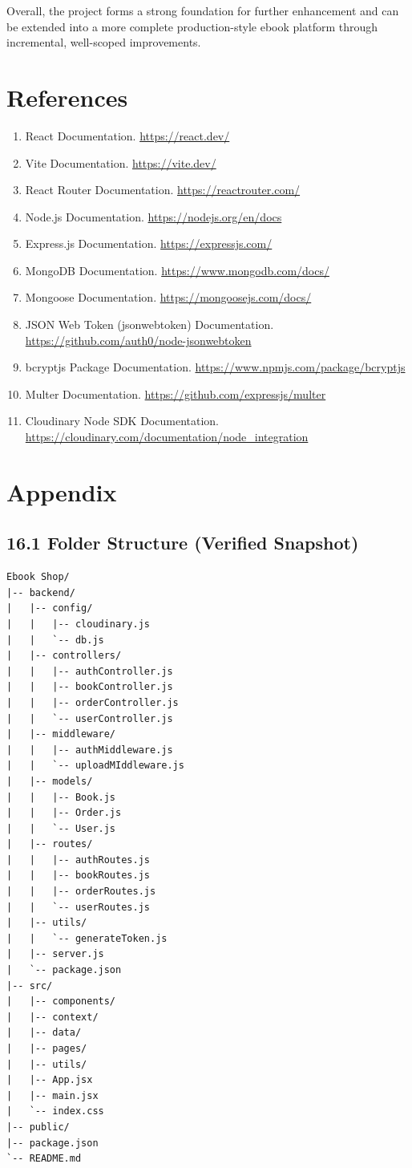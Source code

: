 \documentclass[12pt,a4paper]{report}
\begin{document}
Overall, the project forms a strong foundation for further enhancement and can be extended into a more complete production-style ebook platform through incremental, well-scoped improvements.

\chapter{References}
\begin{enumerate}[label=\arabic*.]
    \item React Documentation. \url{https://react.dev/}
    \item Vite Documentation. \url{https://vite.dev/}
    \item React Router Documentation. \url{https://reactrouter.com/}
    \item Node.js Documentation. \url{https://nodejs.org/en/docs}
    \item Express.js Documentation. \url{https://expressjs.com/}
    \item MongoDB Documentation. \url{https://www.mongodb.com/docs/}
    \item Mongoose Documentation. \url{https://mongoosejs.com/docs/}
    \item JSON Web Token (jsonwebtoken) Documentation. \url{https://github.com/auth0/node-jsonwebtoken}
    \item bcryptjs Package Documentation. \url{https://www.npmjs.com/package/bcryptjs}
    \item Multer Documentation. \url{https://github.com/expressjs/multer}
    \item Cloudinary Node SDK Documentation. \url{https://cloudinary.com/documentation/node_integration}
\end{enumerate}

\chapter{Appendix}
\section*{16.1 Folder Structure (Verified Snapshot)}
\begin{verbatim}
Ebook Shop/
|-- backend/
|   |-- config/
|   |   |-- cloudinary.js
|   |   `-- db.js
|   |-- controllers/
|   |   |-- authController.js
|   |   |-- bookController.js
|   |   |-- orderController.js
|   |   `-- userController.js
|   |-- middleware/
|   |   |-- authMiddleware.js
|   |   `-- uploadMIddleware.js
|   |-- models/
|   |   |-- Book.js
|   |   |-- Order.js
|   |   `-- User.js
|   |-- routes/
|   |   |-- authRoutes.js
|   |   |-- bookRoutes.js
|   |   |-- orderRoutes.js
|   |   `-- userRoutes.js
|   |-- utils/
|   |   `-- generateToken.js
|   |-- server.js
|   `-- package.json
|-- src/
|   |-- components/
|   |-- context/
|   |-- data/
|   |-- pages/
|   |-- utils/
|   |-- App.jsx
|   |-- main.jsx
|   `-- index.css
|-- public/
|-- package.json
`-- README.md
\end{verbatim}
\end{document}
